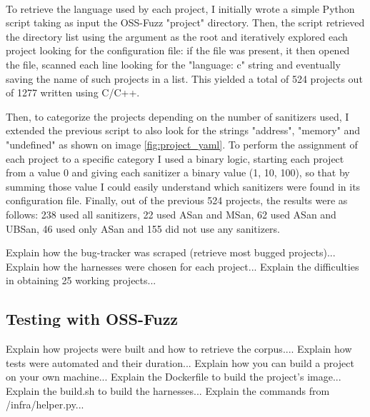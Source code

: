 \documentclass[Lau,oneside]{sapthesis}%
\begin{document}
\ \\
To retrieve the language used by each project, I initially wrote a simple Python script taking as input the OSS-Fuzz "project" directory.
\newline
Then, the script retrieved the directory list using the argument as the root and iteratively explored each project looking for the configuration file: if the file was present, it then opened the file, scanned each line looking for the "language: c" string and eventually saving the name of such projects in a list.
\newline \newline
This yielded a total of 524 projects out of 1277 written using C/C++.


\newpage
Then, to categorize the projects depending on the number of sanitizers used, I extended the previous script to also look for the strings "address", "memory" and "undefined" as shown on image \ref{fig:project_yaml}.
\newline
To perform the assignment of each project to a specific category I used a binary logic, starting each project from a value 0 and giving each sanitizer a binary value (1, 10, 100), so that by summing those value I could easily understand which sanitizers were found in its configuration file.
\newline \newline
Finally, out of the previous 524 projects, the results were as follows: 238 used all sanitizers, 22 used ASan and MSan, 62 used ASan and UBSan, 46 used only ASan and 155 did not use any sanitizers.





\newpage
Explain how the bug-tracker was scraped (retrieve most bugged projects)...
\newline \newline
Explain how the harnesses were chosen for each project...
\newline \newline
Explain the difficulties in obtaining 25 working projects...
\newline \newline
\subsection{Testing with OSS-Fuzz}
Explain how projects were built and how to retrieve the corpus....
\newline \newline
Explain how tests were automated and their duration...
\newline \newline
Explain how you can build a project on your own machine...
\newline \newline
Explain the Dockerfile to build the project's image...
\newline \newline
Explain the build.sh to build the harnesses...
\newline \newline
Explain the commands from /infra/helper.py...
\end{document}
